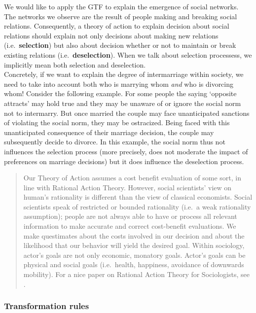 \documentclass[
]{book}
\begin{document}
We would like to apply the GTF to explain the emergence of social networks. The networks we observe are the result of people making and breaking social relations. Consequently, a theory of action to explain decision about social relations should explain not only decisions about making new relations (i.e.~\textbf{selection}) but also about decision whether or not to maintain or break existing relations (i.e.~\textbf{deselection}). When we talk about selection processess, we implicitly mean both selection and deselection.~\\
Concretely, if we want to explain the degree of intermarriage within society, we need to take into account both who is marrying whom \emph{and} who is divorcing whom! Consider the following example. For some people the saying `opposite attracts' may hold true and they may be unaware of or ignore the social norm not to intermarry. But once married the couple may face unanticipated sanctions of violating the social norm, they may be ostracized. Being faced with this unanticipated consequence of their marriage decision, the couple may subsequently decide to divorce. In this example, the social norm thus not influences the selection process (more precisely, does not moderate the impact of preferences on marriage decisions) but it does influence the deselection process.~

\begin{quote}
Our Theory of Action assumes a cost benefit evaluation of some sort, in line with Rational Action Theory. However, social scientists' view on human's rationality is different than the view of classical economists. Social scientists speak of restricted or bounded rationality (i.e.~a weak rationality assumption); people are not always able to have or process all relevant information to make accurate and correct cost-benefit evaluations. We make questimates about the costs involved in our decision and about the likelihood that our behavior will yield the desired goal. Within sociology, actor's goals are not only economic, monatory goals. Actor's goals can be physical and social goals (i.e.~health, happiness, avoidance of downwards mobility). For a nice paper on Rational Action Theory for Sociologists, see \citep{goldthorpe1998}.
\end{quote}

\hypertarget{transformation-rules}{%
\subsubsection*{Transformation rules}\label{transformation-rules}}
\end{document}
